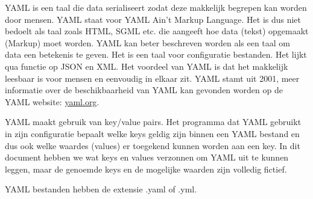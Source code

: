 YAML is een taal die data serialiseert zodat deze makkelijk begrepen kan worden door mensen. YAML staat voor YAML Ain't Markup Language. Het is dus niet bedoelt als taal zoals HTML, SGML etc. die aangeeft hoe data (tekst) opgemaakt (Markup) moet worden. YAML kan beter beschreven worden als een taal om data een betekenis te geven. Het is een taal voor configuratie bestanden. Het lijkt qua functie op JSON en XML. Het voordeel van YAML is dat het makkelijk leesbaar is voor mensen en eenvoudig in elkaar zit. YAML stamt uit 2001, meer informatie over de beschikbaarheid van YAML kan gevonden worden op de YAML website: \url{yaml.org}.

YAML maakt gebruik van key/value pairs. Het programma dat YAML gebruikt in zijn configuratie bepaalt welke keys geldig zijn binnen een YAML bestand en dus ook welke waardes (values) er toegekend kunnen worden aan een key. In dit document hebben we wat keys en values verzonnen om YAML uit te kunnen leggen, maar de genoemde keys en de mogelijke waarden zijn volledig fictief.

YAML bestanden hebben de extensie .yaml of .yml.

